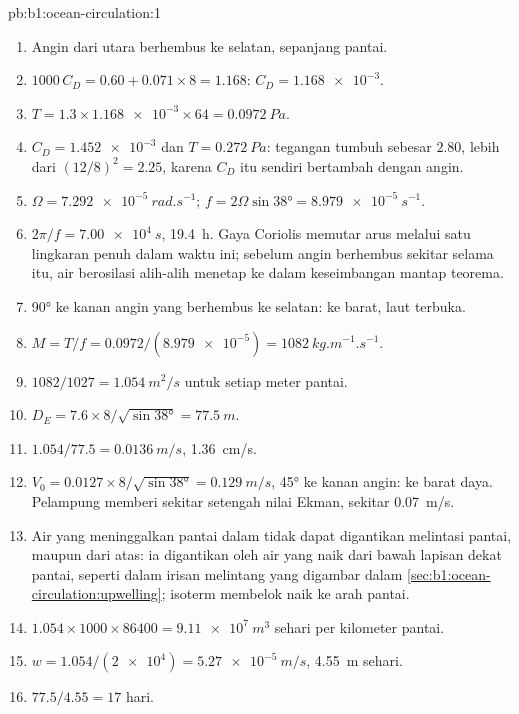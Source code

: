 \begin{solution}{pb:b1:ocean-circulation:1}
\begin{enumerate}
  \item Angin dari utara berhembus ke selatan, sepanjang pantai.
  \item $1000\,C_D = 0.60 + 0.071 \times 8 = 1.168$: $C_D = \num{1.168e-3}$.
  \item $T = 1.3 \times \num{1.168e-3} \times 64 = \qty{0.0972}{Pa}$.
  \item $C_D = \num{1.452e-3}$ dan $T = \qty{0.272}{Pa}$: tegangan tumbuh sebesar $2.80$,
        lebih dari $(12/8)^2 = 2.25$, karena $C_D$ itu sendiri bertambah dengan angin.
  \item $\Omega = \qty{7.292e-5}{rad.s^{-1}}$; $f = 2\Omega\sin\ang{38} =
        \qty{8.979e-5}{s^{-1}}$.
  \item $2\pi/f = \qty{7.00e4}{s}$, \qty{19.4}{h}. Gaya Coriolis memutar arus melalui
        satu lingkaran penuh dalam waktu ini; sebelum angin berhembus sekitar selama itu,
        air berosilasi alih-alih menetap ke dalam keseimbangan mantap teorema.
  \item \ang{90} ke kanan angin yang berhembus ke selatan: ke barat, laut terbuka.
  \item $M = T/f = 0.0972/(\num{8.979e-5}) = \qty{1082}{kg.m^{-1}.s^{-1}}$.
  \item $1082/1027 = \qty{1.054}{m^2/s}$ untuk setiap meter pantai.
  \item $D_E = 7.6 \times 8/\sqrt{\sin\ang{38}} = \qty{77.5}{m}$.
  \item $1.054/77.5 = \qty{0.0136}{m/s}$, \qty{1.36}{cm/s}.
  \item $V_0 = 0.0127 \times 8/\sqrt{\sin\ang{38}} = \qty{0.129}{m/s}$, \ang{45} ke
        kanan angin: ke barat daya. Pelampung memberi sekitar setengah nilai Ekman,
        sekitar \qty{0.07}{m/s}.
  \item Air yang meninggalkan pantai dalam  tidak dapat digantikan melintasi pantai, maupun dari atas: ia digantikan oleh air yang naik dari bawah lapisan
        dekat pantai, seperti dalam irisan melintang yang digambar dalam
        \cref{sec:b1:ocean-circulation:upwelling}; isoterm membelok naik ke arah pantai.
  \item $1.054 \times 1000 \times 86400 = \qty{9.11e7}{m^3}$ sehari per kilometer
        pantai.
  \item $w = 1.054/(\num{2e4}) = \qty{5.27e-5}{m/s}$, \qty{4.55}{m} sehari.
  \item $77.5/4.55 = 17$ hari.

\end{enumerate}
\end{solution}
